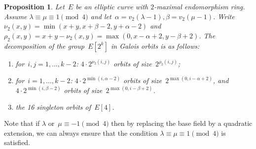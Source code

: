 \documentclass{lms}
\newtheorem{prop}[thm]{Proposition}
\def\mat#1{\begin{pmatrix}#1\end{pmatrix}}
\def\smat#1{{\def\arraystretch{.7}\mat{#1}}}
\def\acco#1{\left\{#1\right\}}
\begin{document}
\begin{prop}\label{prop:orbites-2-torsion}
Let~$E$ be an elliptic curve with $2$-maximal endomorphism ring.
Assume $λ ≡ μ ≡ 1 \pmod{4}$ and let~$α = v_2(λ-1), β=v_2(μ-1)$.
Write~$ν_2(x, y) = \min (x+y, x+β-2, y+α-2)$
and~$ρ_2(x, y) = x+y - ν_2(x, y) = \max (0, x-α+2, y-β+2)$.
The decomposition of the group~$E[2^k]$ in Galois orbits is as follows:
\begin{enumerate}
\item for~$i, j = 1, …, k-2$:
$4 · 2^{ν_2(i,j)}$ orbits of size~$2^{ρ_2(i,j)}$;
\item for~$i = 1, …, k-2$:
$4 · 2^{\min (i, α-2)}$ orbits of size~$2^{\max (0, i-α+2)}$, and
$4 · 2^{\min (i, β-2)}$ orbits of size~$2^{\max (0, i-β+2)}$.
\item the 16 singleton orbits of~$E[4]$.
\end{enumerate}
\end{prop}
Note that if $λ$ or~$μ ≡ -1 \pmod{4}$ then
by replacing the base field by a quadratic extension,
we can always ensure that the condition $λ ≡ μ ≡ 1 \pmod{4}$ is
satisfied.
% 
% 
\end{document}
